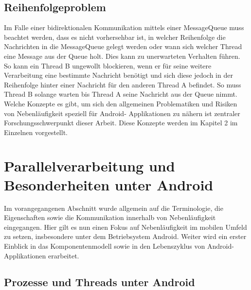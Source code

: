 \documentclass[12pt,oneside,a4paper,bibtotoc,liststotoc]{scrreprt}
\begin{document}
\subsection{Reihenfolgeproblem}
Im Falle einer bidirektionalen Kommunikation mittels einer MessageQueue muss beachtet werden, dass es nicht vorhersehbar ist, in welcher Reihenfolge die Nachrichten in die MessageQueue gelegt werden oder wann sich welcher Thread eine Message aus der Queue holt. Dies kann zu unerwarteten Verhalten führen. So kann ein Thread B ungewollt blockieren, wenn er für seine weitere Verarbeitung eine bestimmte Nachricht benötigt und sich diese jedoch in der Reihenfolge hinter einer Nachricht für den anderen Thread A befindet. So muss Thread B solange warten bis Thread A seine Nachricht aus der Queue nimmt.
\newline
Welche Konzepte es gibt, um sich den allgemeinen Problematiken und Risiken von Nebenläufigkeit speziell für Android- Applikationen zu nähern ist zentraler Forschungsschwerpunkt dieser Arbeit. Diese Konzepte werden im Kapitel 2 im Einzelnen vorgestellt.


\section{Parallelverarbeitung und Besonderheiten unter Android}
Im vorangegangenen Abschnitt wurde allgemein auf die Terminologie, die Eigenschaften sowie die Kommunikation innerhalb von Nebenläufigkeit eingegangen. Hier gilt es nun einen Fokus auf Nebenläufigkeit im mobilen Umfeld zu setzen, insbesondere unter dem Betriebsystem Android. Weiter wird ein erster Einblick in das Komponentenmodell sowie in den Lebenszyklus von Android- Applikationen erarbeitet.


\subsection{Prozesse und Threads unter Android}
\end{document}

